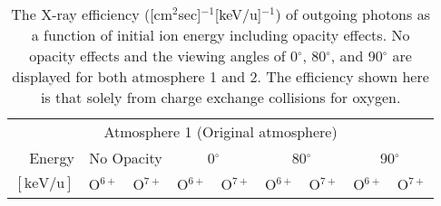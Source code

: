 \begin{table}[ht]
    \centering
    \caption{The X-ray efficiency ([cm$^2$sec]$^{-1}$[keV/u]$^{-1}$) of outgoing photons as a function of initial ion energy including opacity effects. No opacity effects and the viewing angles of 0$^\circ$, 80$^\circ$, and 90$^\circ$ are displayed for both atmosphere 1 and 2. The efficiency shown here is that solely from charge exchange collisions for oxygen.}
    \begin{tabular}{r|c|c|c|c|c|c|c|c}
    \multicolumn{9}{c}{Atmosphere 1 (Original atmosphere)} \\ \cline{2-9}
    Energy & \multicolumn{2}{c|}{No Opacity} & \multicolumn{2}{c|}{0$^\circ$} & \multicolumn{2}{c|}{80$^\circ$} & \multicolumn{2}{c}{90$^\circ$} \\ \cline{2-9}
    $\mathrm{[keV/u]}$ & O$^{6+}$ & O$^{7+}$ & O$^{6+}$ & O$^{7+}$ & O$^{6+}$ & O$^{7+}$ & O$^{6+}$ & O$^{7+}$ \\ \cline{1-9}
    

\end{tabular}
\end{table}
